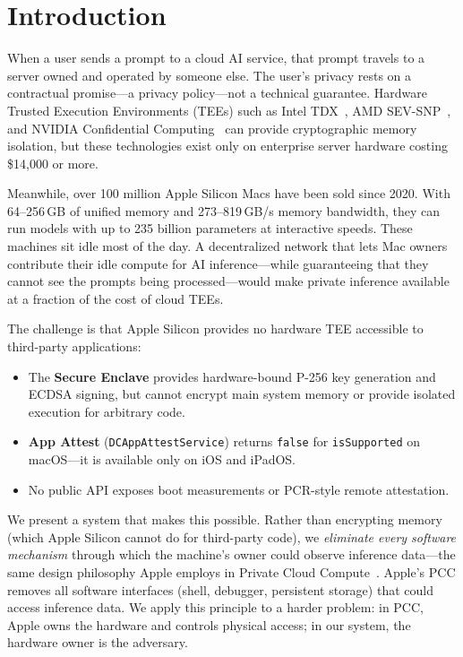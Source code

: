\documentclass[10pt,twocolumn,letterpaper]{article}
\begin{document}
\section{Introduction}
\label{sec:intro}

When a user sends a prompt to a cloud AI service, that prompt travels to a server owned and operated by someone else. The user's privacy rests on a contractual promise---a privacy policy---not a technical guarantee. Hardware Trusted Execution Environments (TEEs) such as Intel TDX~\cite{intel-tdx}, AMD SEV-SNP~\cite{amd-sev}, and NVIDIA Confidential Computing~\cite{nvidia-cc} can provide cryptographic memory isolation, but these technologies exist only on enterprise server hardware costing \$14,000 or more.

Meanwhile, over 100 million Apple Silicon Macs have been sold since 2020. With 64--256\,GB of unified memory and 273--819\,GB/s memory bandwidth, they can run models with up to 235 billion parameters at interactive speeds. These machines sit idle most of the day. A decentralized network that lets Mac owners contribute their idle compute for AI inference---while guaranteeing that they cannot see the prompts being processed---would make private inference available at a fraction of the cost of cloud TEEs.

The challenge is that Apple Silicon provides no hardware TEE accessible to third-party applications:

\begin{itemize}[leftmargin=*,itemsep=2pt,topsep=2pt]
    \item The \textbf{Secure Enclave} provides hardware-bound P-256 key generation and ECDSA signing, but cannot encrypt main system memory or provide isolated execution for arbitrary code.
    \item \textbf{App Attest} (\texttt{DCAppAttestService}) returns \texttt{false} for \texttt{isSupported} on macOS---it is available only on iOS and iPadOS.
    \item No public API exposes boot measurements or PCR-style remote attestation.
\end{itemize}

We present a system that makes this possible. Rather than encrypting memory (which Apple Silicon cannot do for third-party code), we \emph{eliminate every software mechanism} through which the machine's owner could observe inference data---the same design philosophy Apple employs in Private Cloud Compute~\cite{apple-pcc}. Apple's PCC removes all software interfaces (shell, debugger, persistent storage) that could access inference data. We apply this principle to a harder problem: in PCC, Apple owns the hardware and controls physical access; in our system, the hardware owner is the adversary.
\end{document}
